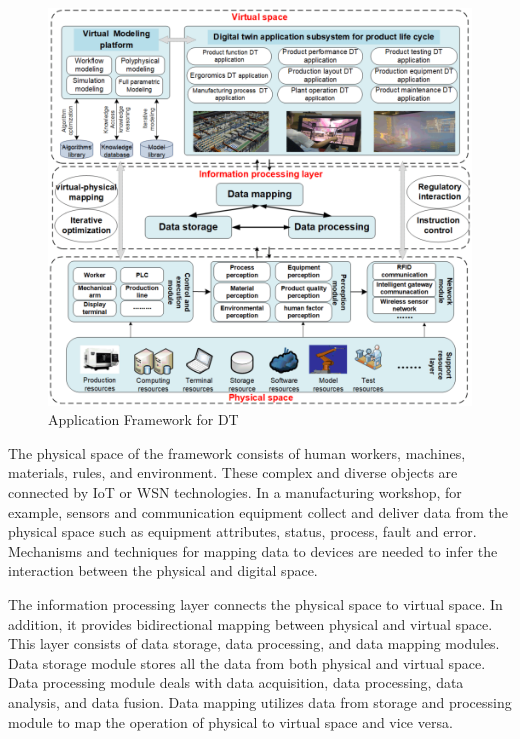 \documentclass[article]{aaltoseries}
\begin{document}
\begin{figure}[t!]
	\begin{center}
		\includegraphics[width=1\textwidth]{figures/app_framework_yu_zheng_et_al}
		\caption{Application Framework for DT \cite{zheng2019application}}
		\label{fig:app_framwork_zheng}
	\end{center}
\end{figure}

The physical space of the framework consists of human workers, machines, materials, rules, and environment. These complex and diverse objects are connected by IoT or WSN technologies. In a manufacturing workshop, for example, sensors and communication equipment collect and deliver data from the physical space such as equipment attributes, status, process, fault and error. Mechanisms and techniques for mapping data to devices are needed to infer the interaction between the physical and digital space.

The information processing layer connects the physical space to virtual space. In addition, it provides bidirectional mapping between physical and virtual space. This layer consists of data storage, data processing, and data mapping modules. Data storage module stores all the data from both physical and virtual space. Data processing module deals with data acquisition, data processing, data analysis, and data fusion. Data mapping utilizes data from storage and processing module to map the operation of physical to virtual space and vice versa.
\end{document}
